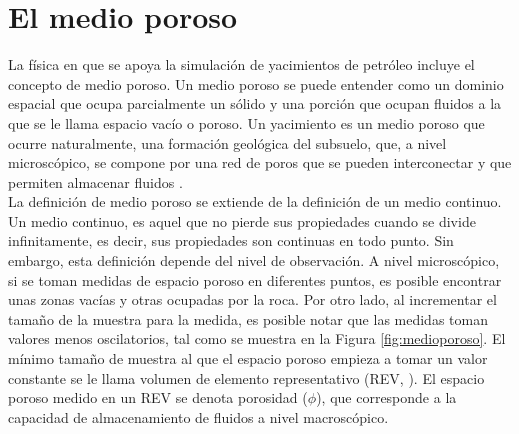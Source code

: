 \section{El medio poroso}

La física en que se apoya la simulación de yacimientos de petróleo incluye el concepto de medio poroso. Un medio poroso se puede entender como un dominio espacial que ocupa parcialmente un sólido y una porción que ocupan fluidos a la que se le llama espacio vacío o poroso. Un yacimiento es un medio poroso que ocurre naturalmente, una formación geológica del subsuelo, que, a nivel microscópico, se compone por una red de poros que se pueden interconectar y que permiten almacenar fluidos \citep{Bear2018}.\\

La definición de medio poroso se extiende de la definición de un medio continuo. Un medio continuo, es aquel que no pierde sus propiedades cuando se divide infinitamente, es decir, sus propiedades son continuas en todo punto. Sin embargo, esta definición depende del nivel de observación. A nivel microscópico, si se toman medidas de espacio poroso en diferentes puntos, es posible encontrar unas zonas vacías y otras ocupadas por la roca. Por otro lado, al incrementar el tamaño de la muestra para la medida, es posible notar que las medidas toman valores menos oscilatorios, tal como se muestra en la Figura \ref{fig:medioporoso}. El mínimo tamaño de muestra al que el espacio poroso empieza a tomar un valor constante se le llama volumen de elemento representativo (REV, \cite{Bear2018}). El espacio poroso medido en un REV se denota porosidad ($\phi$), que corresponde a la capacidad de almacenamiento de fluidos a nivel macroscópico.\\

